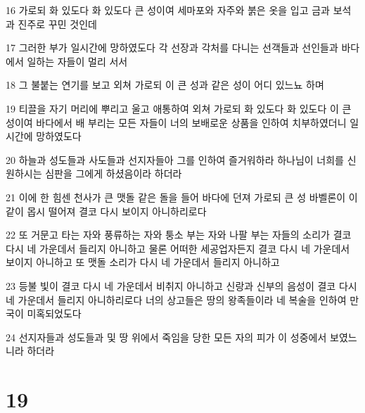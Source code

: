 \par 16 가로되 화 있도다 화 있도다 큰 성이여 세마포와 자주와 붉은 옷을 입고 금과 보석과 진주로 꾸민 것인데
\par 17 그러한 부가 일시간에 망하였도다 각 선장과 각처를 다니는 선객들과 선인들과 바다에서 일하는 자들이 멀리 서서
\par 18 그 불붙는 연기를 보고 외쳐 가로되 이 큰 성과 같은 성이 어디 있느뇨 하며
\par 19 티끌을 자기 머리에 뿌리고 울고 애통하여 외쳐 가로되 화 있도다 화 있도다 이 큰 성이여 바다에서 배 부리는 모든 자들이 너의 보배로운 상품을 인하여 치부하였더니 일시간에 망하였도다
\par 20 하늘과 성도들과 사도들과 선지자들아 그를 인하여 즐거워하라 하나님이 너희를 신원하시는 심판을 그에게 하셨음이라 하더라
\par 21 이에 한 힘센 천사가 큰 맷돌 같은 돌을 들어 바다에 던져 가로되 큰 성 바벨론이 이같이 몹시 떨어져 결코 다시 보이지 아니하리로다
\par 22 또 거문고 타는 자와 풍류하는 자와 퉁소 부는 자와 나팔 부는 자들의 소리가 결코 다시 네 가운데서 들리지 아니하고 물론 어떠한 세공업자든지 결코 다시 네 가운데서 보이지 아니하고 또 맷돌 소리가 다시 네 가운데서 들리지 아니하고
\par 23 등불 빛이 결코 다시 네 가운데서 비취지 아니하고 신랑과 신부의 음성이 결코 다시 네 가운데서 들리지 아니하리로다 너의 상고들은 땅의 왕족들이라 네 복술을 인하여 만국이 미혹되었도다
\par 24 선지자들과 성도들과 및 땅 위에서 죽임을 당한 모든 자의 피가 이 성중에서 보였느니라 하더라

\chapter{19}

